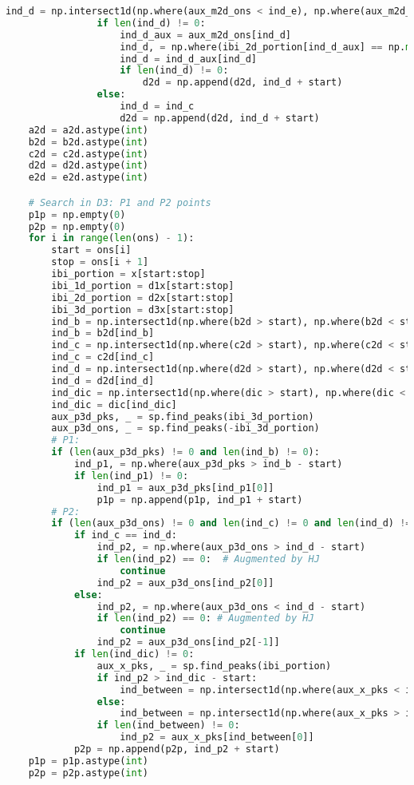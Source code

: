 \begin{lstlisting}[language=Python,label={lst:fidp.py}, basicstyle=\scriptsize]
                ind_d = np.intersect1d(np.where(aux_m2d_ons < ind_e), np.where(aux_m2d_ons > ind_c))
                if len(ind_d) != 0:
                    ind_d_aux = aux_m2d_ons[ind_d]
                    ind_d, = np.where(ibi_2d_portion[ind_d_aux] == np.min(ibi_2d_portion[ind_d_aux]))
                    ind_d = ind_d_aux[ind_d]
                    if len(ind_d) != 0:
                        d2d = np.append(d2d, ind_d + start)
                else:
                    ind_d = ind_c
                    d2d = np.append(d2d, ind_d + start)
    a2d = a2d.astype(int)
    b2d = b2d.astype(int)
    c2d = c2d.astype(int)
    d2d = d2d.astype(int)
    e2d = e2d.astype(int)

    # Search in D3: P1 and P2 points
    p1p = np.empty(0)
    p2p = np.empty(0)
    for i in range(len(ons) - 1):
        start = ons[i]
        stop = ons[i + 1]
        ibi_portion = x[start:stop]
        ibi_1d_portion = d1x[start:stop]
        ibi_2d_portion = d2x[start:stop]
        ibi_3d_portion = d3x[start:stop]
        ind_b = np.intersect1d(np.where(b2d > start), np.where(b2d < stop))
        ind_b = b2d[ind_b]
        ind_c = np.intersect1d(np.where(c2d > start), np.where(c2d < stop))
        ind_c = c2d[ind_c]
        ind_d = np.intersect1d(np.where(d2d > start), np.where(d2d < stop))
        ind_d = d2d[ind_d]
        ind_dic = np.intersect1d(np.where(dic > start), np.where(dic < stop))
        ind_dic = dic[ind_dic]
        aux_p3d_pks, _ = sp.find_peaks(ibi_3d_portion)
        aux_p3d_ons, _ = sp.find_peaks(-ibi_3d_portion)
        # P1:
        if (len(aux_p3d_pks) != 0 and len(ind_b) != 0):
            ind_p1, = np.where(aux_p3d_pks > ind_b - start)
            if len(ind_p1) != 0:
                ind_p1 = aux_p3d_pks[ind_p1[0]]
                p1p = np.append(p1p, ind_p1 + start)
        # P2:
        if (len(aux_p3d_ons) != 0 and len(ind_c) != 0 and len(ind_d) != 0):
            if ind_c == ind_d:
                ind_p2, = np.where(aux_p3d_ons > ind_d - start)
                if len(ind_p2) == 0:  # Augmented by HJ
                    continue
                ind_p2 = aux_p3d_ons[ind_p2[0]]
            else:
                ind_p2, = np.where(aux_p3d_ons < ind_d - start)
                if len(ind_p2) == 0: # Augmented by HJ
                    continue
                ind_p2 = aux_p3d_ons[ind_p2[-1]]
            if len(ind_dic) != 0:
                aux_x_pks, _ = sp.find_peaks(ibi_portion)
                if ind_p2 > ind_dic - start:
                    ind_between = np.intersect1d(np.where(aux_x_pks < ind_p2), np.where(aux_x_pks > ind_dic - start))
                else:
                    ind_between = np.intersect1d(np.where(aux_x_pks > ind_p2), np.where(aux_x_pks < ind_dic - start))
                if len(ind_between) != 0:
                    ind_p2 = aux_x_pks[ind_between[0]]
            p2p = np.append(p2p, ind_p2 + start)
    p1p = p1p.astype(int)
    p2p = p2p.astype(int)


\end{lstlisting}
